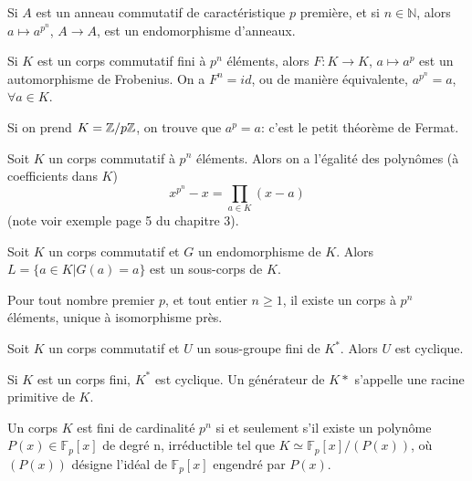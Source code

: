 \documentclass[12pt,a4paper]{article}
\begin{document}
\begin{flushleft}
\begin{prop} 
Si $A$ est un anneau commutatif de caractéristique $p$ première, et si $n \in \mathbb{N}$, alors $a \mapsto a^{p^n}$, $A \rightarrow A$, est un endomorphisme d'anneaux.
\end{prop}


\begin{cor}
Si $K$ est un corps commutatif fini à $p^n$ éléments, alors $F: K \rightarrow K$, $a \mapsto a^p$ est un automorphisme de Frobenius. On a $F^n = id$, ou de manière équivalente, $ a^{p^n} = a$, $\forall a \in K$.
\end{cor}

\begin{rem}
Si on prend $K = \mathbb{Z} / p \mathbb{Z}$, on trouve que $a^p = a$: c'est le petit théorème de Fermat.
\end{rem}

\begin{cor}
Soit $K$ un corps commutatif à $p^n$ éléments. Alors on a l'égalité des polynômes (à coefficients dans $K$) $$ x^{p^n} - x = \prod_{a \in K} (x-a)$$
(note voir exemple page 5 du chapitre 3).
\end{cor}

\begin{prop} 
Soit $K$ un corps commutatif et $G$ un endomorphisme de $K$. Alors $L = \{ a \in K | G(a) = a \}$ est un sous-corps de $K$.
\end{prop}


\begin{thm}
Pour tout nombre premier $p$, et tout entier $n \geq 1$, il existe un corps à $p^n$ éléments, unique à isomorphisme près. 
\end{thm}

\begin{thm}
Soit $K$ un corps commutatif et $U$ un sous-groupe fini de $K^*$. Alors $U$ est cyclique.
\end{thm}

\begin{cor}
Si $K$ est un corps fini, $K^*$ est cyclique. Un générateur de $K*$ s'appelle une racine primitive de $K$.
\end{cor}

\begin{cor}
Un corps $K$ est fini de cardinalité $p^n$ si et seulement s'il existe un polynôme $P(x) \in \mathbb{F}_p [x]$ de degré n, irréductible tel que $K \simeq \mathbb{F}_p [x] / (P(x))$, où $(P(x))$ désigne l'idéal de $\mathbb{F}_p [x]$ engendré par $P(x)$.
\end{cor}


\end{flushleft}
\end{document}
